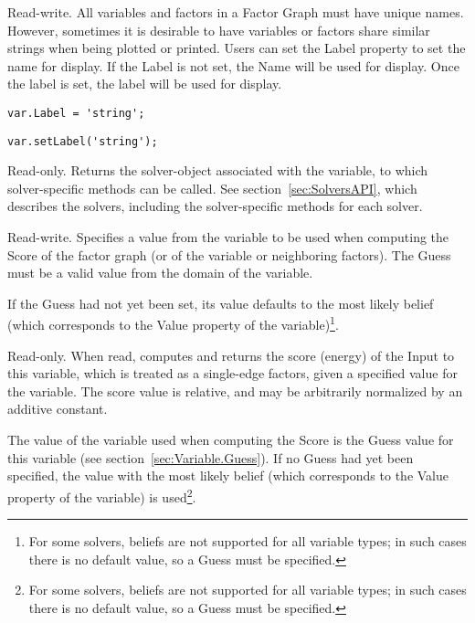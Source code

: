 \fi


Read-write. All variables and factors in a Factor Graph must have unique names. However, sometimes it is desirable to have variables or factors share similar strings when being plotted or printed. Users can set the Label property to set the name for display. If the Label is not set, the Name will be used for display. Once the label is set, the label will be used for display.

\ifmatlab
\begin{lstlisting}
var.Label = 'string';
\end{lstlisting}
\fi

\ifjava
\begin{lstlisting}
var.setLabel('string');
\end{lstlisting}
\fi



Read-only.  Returns the solver-object associated with the variable, to which solver-specific methods can be called.  See section~\ref{sec:SolversAPI}, which describes the solvers, including the solver-specific methods for each solver.

\label{sec:Variable.Guess}

Read-write.  Specifies a value from the variable to be used when computing the Score of the factor graph (or of the variable or neighboring factors).  The Guess must be a valid value from the domain of the variable.

If the Guess had not yet been set, its value defaults to the most likely belief (which corresponds to the Value property of the variable)\footnote{For some solvers, beliefs are not supported for all variable types; in such cases there is no default value, so a Guess must be specified.}.


\label{sec:Variable.Score}

Read-only.  When read, computes and returns the score (energy) of the Input to this variable, which is treated as a single-edge factors, given a specified value for the variable.  The score value is relative, and may be arbitrarily normalized by an additive constant.

The value of the variable used when computing the Score is the Guess value for this variable (see section~\ref{sec:Variable.Guess}).  If no Guess had yet been specified, the value with the most likely belief (which corresponds to the Value property of the variable) is used\footnote{For some solvers, beliefs are not supported for all variable types; in such cases there is no default value, so a Guess must be specified.}.


